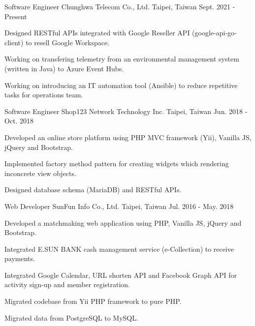 

\begin{cventries}

  \cventry
    {Software Engineer} %
    {Chunghwa Telecom Co., Ltd.} %
    {Taipei, Taiwan} %
    {Sept. 2021 - Present} %
    {
      \begin{cvitems} %
      \item {Designed RESTful APIs integrated with Google Reseller API (google-api-go-client) to resell Google Workspace.}
      \item {Working on transfering telemetry from an environmental management system (written in Java) to Azure Event Hubs.}
      \item {Working on introducing an IT automation tool (Ansible) to reduce repetitive tasks for operations team.}
      \end{cvitems}
    }
  \cventry
    {Software Engineer} %
    {Shop123 Network Technology Inc.} %
    {Taipei, Taiwan} %
    {Jun. 2018 - Oct. 2018} %
    {
      \begin{cvitems} %
        \item {Developed an online store platform using PHP MVC framework (Yii), Vanilla JS, jQuery and Bootstrap.}
        \item {Implemented factory method pattern for creating widgets which rendering inconcrete view objects.}
        \item {Designed database schema (MariaDB) and RESTful APIs.}
      \end{cvitems}
    }

  \cventry
    {Web Developer} %
    {SunFun Info Co., Ltd.} %
    {Taipei, Taiwan} %
    {Jul. 2016 - May. 2018} %
    {
      \begin{cvitems} %
        \item {Developed a matchmaking web application using PHP, Vanilla JS, jQuery and Bootstrap.}
        \item {Integrated E.SUN BANK cash management service (e-Collection) to receive payments.}
        \item {Integrated Google Calendar, URL shorten API and Facebook Graph API for activity sign-up and member registration.}
        \item {Migrated codebase from Yii PHP framework to pure PHP.}
        \item {Migrated data from PostgreSQL to MySQL.}
      \end{cvitems}
    }

\end{cventries}
